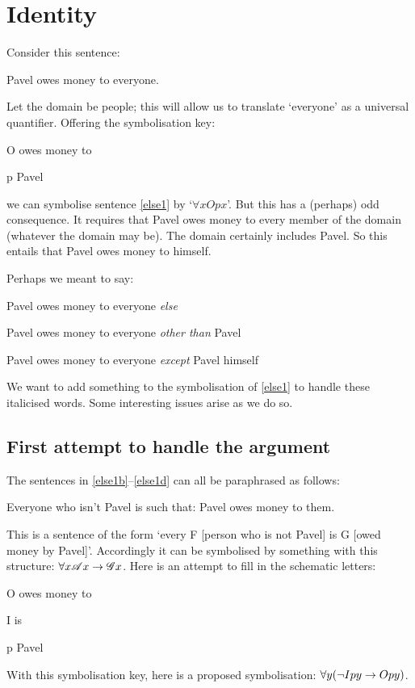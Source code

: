 \chapter{Identity}
\label{sec.identity}

Consider this sentence:
\begin{earg}
\item[\ex{else1}] Pavel owes money to everyone.
\end{earg}
Let the domain be people; this will allow us to translate `everyone' as a universal quantifier. Offering the symbolisation key:
	\begin{ekey}
		\item[O\meta{xy}]  owes money to 
		\item[p] Pavel
	\end{ekey}
we can symbolise sentence \ref{else1} by `$\forall x Opx$'. But this has a (perhaps) odd consequence. It requires that Pavel owes money to every member of the domain (whatever the domain may be). The domain certainly includes Pavel. So this entails that Pavel owes money to himself. 

Perhaps we meant to say:
	\begin{earg}
		\item[\ex{else1b}] Pavel owes money to everyone \emph{else}
		\item[\ex{else1c}] Pavel owes money to everyone \emph{other than} Pavel
		\item[\ex{else1d}] Pavel owes money to everyone \emph{except} Pavel himself
	\end{earg}
We want to add something to the symbolisation of \ref{else1} to handle these italicised words. Some interesting issues arise as we do so.


\section{First attempt to handle the argument}

The sentences in \ref{else1b}–\ref{else1d} can all be paraphrased as follows:
\begin{earg}
	\item[\ex{else1e}] Everyone who isn't Pavel is such that: Pavel owes money to them.
\end{earg} This is a sentence of the form `every F [person who is not Pavel] is G [owed money by Pavel]'. Accordingly it can be symbolised by something with this structure: $\forall x \mathscr{A}x \rightarrow \mathscr{G}x$. Here is an attempt to fill in the schematic letters:
	\begin{ekey}
		\item[O\meta{xy}]  owes money to \gap{y}
		\item[I\meta{xy}]  is \gap{y}
		\item[p] Pavel
	\end{ekey}
With this symbolisation  key, here is a proposed symbolisation: $\forall y (\neg Ipy \rightarrow Opy)$. 

